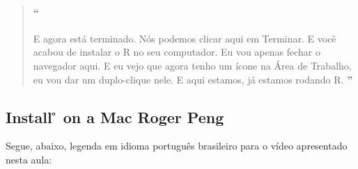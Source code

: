 \begin{quotation}
\begin{small}
\paragraph{``}
E agora está terminado. Nós podemos clicar aqui em Terminar. E você acabou de instalar o R no seu computador. Eu vou apenas fechar o navegador aqui. E eu vejo que agora tenho um  ícone na Área de Trabalho, eu vou dar um duplo-clique nele. E aqui estamos, já estamos rodando R. 
{\large\textbf{''}}
\end{small}
\end{quotation}


\subsection{Install \r{} on a Mac {Roger Peng}}

Segue, abaixo, legenda em idioma português brasileiro para o vídeo apresentado nesta aula:

